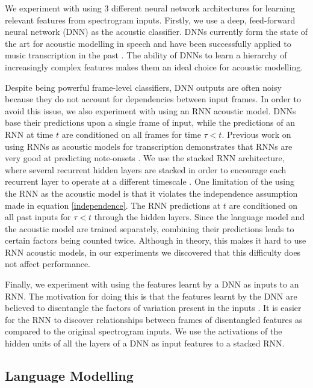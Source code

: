 \documentclass{article}
\begin{document}
We experiment with using 3 different neural network architectures for learning relevant features from spectrogram inputs. Firstly, we use a deep, feed-forward neural network (DNN) as the acoustic classifier. DNNs currently form the state of the art for acoustic modelling in speech \cite{hinton2012deep} and have been successfully applied to music transcription in the past \cite{nam2011classification}. The ability of DNNs to learn a hierarchy of increasingly complex features makes them an ideal choice for acoustic modelling. 

Despite being powerful frame-level classifiers, DNN outputs are often noisy because they do not account for dependencies between input frames. In order to avoid this issue, we also experiment with using an RNN acoustic model. DNNs base their predictions upon a single frame of input, while the predictions of an RNN at time $t$ are conditioned on all frames for time $\tau < t$. Previous work on using RNNs as acoustic models for transcription demonstrates that RNNs are very good at predicting note-onsets \cite{bock2012polyphonic}. We use the stacked RNN architecture, where several recurrent hidden layers are stacked in order to encourage each recurrent layer to operate at a different timescale \cite{schmidhuber1992learning}. One limitation of the using the RNN as the acoustic model is that it violates the independence assumption made in equation \ref{independence}. The RNN predictions at $t$ are conditioned on all past inputs for $\tau < t$ through the hidden layers. Since the language model and the acoustic model are trained separately, combining their predictions leads to certain factors being counted twice. Although in theory, this makes it hard to use RNN acoustic models, in our experiments we discovered that this difficulty does not affect performance. 

Finally, we experiment with using the features learnt by a DNN as inputs to an RNN. The motivation for doing this is that the features learnt by the DNN are believed to disentangle the factors of variation present in the inputs \cite{goodfellow2009measuring}. It is easier for the RNN to discover relationships between frames of disentangled features as compared to the original spectrogram inputs. We use the activations of the hidden units of all the layers of a DNN as input features to a stacked RNN. 
\subsection{Language Modelling}
\end{document}
